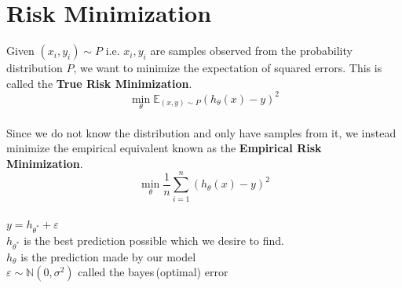 \documentclass[12pt,a4paper,titlepage,portrait,openany]{book}
\begin{document}
	\section{Risk Minimization}
	Given $(x_i, y_i)\sim P$ i.e. $x_i, y_i$ are samples observed from the probability distribution $P$, we want to minimize the expectation of squared errors. This is called the \textbf{True Risk Minimization}.
	$$\min\limits_{\theta}\mathbb{E}_{(x,y)\sim{P}} (h_\theta(x)-y)^2$$ \\
	Since we do not know the distribution and only have samples from it, we instead minimize the empirical equivalent known as the \textbf{Empirical Risk Minimization}.
	$$\min\limits_{\theta} \dfrac{1}{n} \sum_{i=1}^{n} (h_\theta(x)-y)^2$$ \\
	$y = h_{\theta^*}+\varepsilon$\\
	$h_{\theta^*}$ is the best prediction possible which we desire to find. \\
	$h_{\theta}$ is the prediction made by our model \\
	$\varepsilon \sim \mathbb{N}(0, \sigma^2)$ called the bayes\,(optimal) error\\
	
\end{document}
